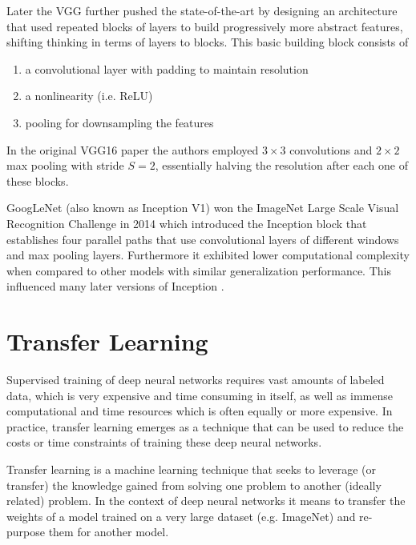 Later the \ac{VGG} further pushed the state-of-the-art by designing an architecture that used repeated blocks of layers to build progressively more abstract features, shifting thinking in terms of layers to blocks. This basic building block consists of

\begin{enumerate}
    \item a convolutional layer with padding to maintain resolution
    \item a nonlinearity (i.e. ReLU)
    \item pooling for downsampling the features
\end{enumerate}

In the original VGG16 paper \cite{vgg16} the authors employed $3 \times 3$ convolutions and $2 \times 2$ max pooling with stride $S = 2$, essentially halving the resolution after each one of these blocks.

GoogLeNet\cite{inceptionv1} (also known as Inception V1) won the ImageNet Large Scale Visual Recognition Challenge \cite{imagenet} in 2014 which introduced the Inception block that establishes four parallel paths that use convolutional layers of different windows and max pooling layers. Furthermore it exhibited lower computational complexity when compared to other models with similar generalization performance. This influenced many later versions of Inception \cite{inceptionv2_3}\cite{inceptionv4}.


\section{Transfer Learning}
\label{section:transferlearning}

Supervised training of deep neural networks requires vast amounts of labeled data, which is very expensive and time consuming in itself, as well as immense computational and time resources which is often equally or more expensive. In practice, transfer learning emerges as a technique that can be used to reduce the costs or time constraints of training these deep neural networks.

Transfer learning is a machine learning technique that seeks to leverage (or transfer) the knowledge gained from solving one problem to another (ideally related) problem. In the context of deep neural networks it means to transfer the weights of a model trained on a very large dataset (e.g. ImageNet\cite{imagenet}) and re-purpose them for another model.

